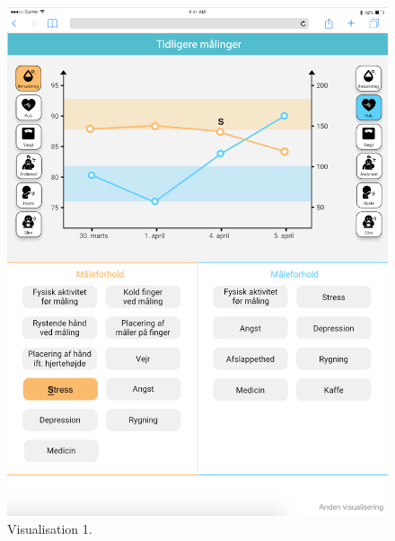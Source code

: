 \begin{figure}[h]
  \centering
  \begin{minipage}[b]{0.45\textwidth}
    \includegraphics[width=\textwidth]{images/study2/v1.png}
    \caption{Visualisation 1.}
    \label{fig:v1}
  \end{minipage}
  \hfill
  \begin{minipage}[b]{0.45\textwidth}

\end{minipage}
\end{figure}
